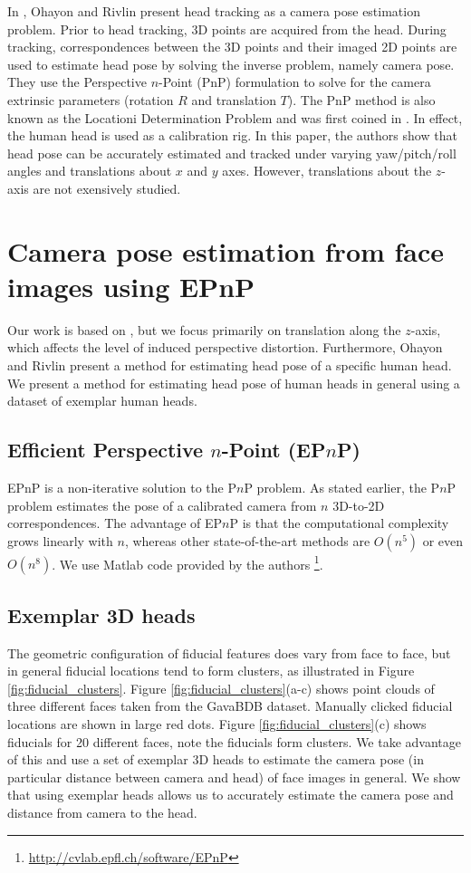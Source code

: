 \documentclass[runningheads]{llncs}
\begin{document}
In \cite{ohayon2006robust}, Ohayon and Rivlin present head tracking as a camera pose estimation problem.  Prior to head tracking, 3D points are acquired from the head.  During tracking, correspondences between the 3D points and their imaged 2D points are used to estimate head pose by solving the inverse problem, namely camera pose.  They use the Perspective $n$-Point (PnP) formulation to solve for the camera extrinsic parameters (rotation $R$ and translation $T$).  The PnP method is also known as the Locationi Determination Problem and was first coined in \cite{ransac}.  In effect, the human head is used as a calibration rig.  In this paper, the authors show that head pose can be accurately estimated and tracked under varying yaw/pitch/roll angles and translations about $x$ and $y$ axes.  However, translations about the $z$-axis are not exensively studied.  

\section{Camera pose estimation from face images using EPnP}

Our work is based on \cite{ohayon2006robust}, but we focus primarily on translation along the $z$-axis, which affects the level of induced perspective distortion.  Furthermore, Ohayon and Rivlin present a method for estimating head pose of a specific human head.  We present a method for estimating head pose of human heads in general using a dataset of exemplar human heads. 

\subsection{Efficient Perspective $n$-Point (EP$n$P)}
EPnP is a non-iterative solution to the P$n$P problem.  As stated earlier, the P$n$P problem estimates the pose of a calibrated camera from $n$ 3D-to-2D correspondences.  The advantage of EP$n$P is that the computational complexity grows linearly with $n$, whereas other state-of-the-art methods are $O(n^5)$ or even $O(n^8)$.  We use Matlab code provided by the authors \footnote{\url{http://cvlab.epfl.ch/software/EPnP}}.

\subsection{Exemplar 3D heads}
The geometric configuration of fiducial features does vary from face to face, but in general fiducial locations tend to form clusters, as illustrated in Figure \ref{fig:fiducial_clusters}.  Figure \ref{fig:fiducial_clusters}(a-c) shows point clouds of three different faces taken from the GavaBDB \cite{moreno2004gavabdb} dataset.  Manually clicked fiducial locations are shown in large red dots.  Figure \ref{fig:fiducial_clusters}(c) shows fiducials for 20 different faces, note the fiducials form clusters.  We take advantage of this and use a set of exemplar 3D heads to estimate the camera pose (in particular distance between camera and head) of face images in general. We show that using exemplar heads allows us to accurately estimate the camera pose and distance from camera to the head.
\end{document}
